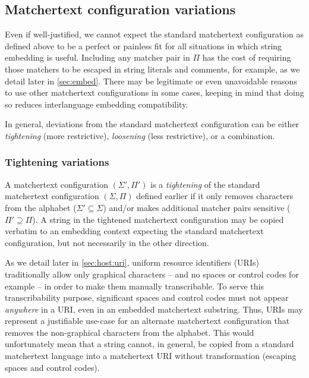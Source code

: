 \subsection{Matchertext configuration variations}
\label{sec:design:concrete:variations}

Even if well-justified,
we cannot expect the standard matchertext configuration
as defined above to be a perfect or painless fit
for all situations in which string embedding is useful.
Including any matcher pair in $\Pi$ has the cost
of requiring those matchers to be escaped
in string literals and comments, for example,
as we detail later in \cref{sec:embed}.
There may be legitimate or even unavoidable reasons
to use other matchertext configurations in some cases,
keeping in mind that doing so reduces interlanguage embedding compatibility.

In general, deviations from the standard matchertext configuration
can be either \emph{tightening} (more restrictive),
\emph{loosening} (less restrictive), or a combination.

\subsubsection{Tightening variations}
\label{sec:design:concrete:variations:tight}

A matchertext configuration $(\Sigma',\Pi')$
is a \emph{tightening} of
the standard matchertext configuration $(\Sigma,\Pi)$ defined earlier
if it only removes characters from the alphabet ($\Sigma' \subseteq \Sigma$)
and/or makes additional matcher pairs sensitive ($\Pi' \supseteq \Pi$).
A string in the tightened matchertext configuration
may be copied verbatim to an embedding context
expecting the standard matchertext configuration,
but not necessarily in the other direction.

As we detail later in \cref{sec:host:uri},
uniform resource identifiers (URIs)~\cite{rfc3986} traditionally allow
only graphical characters -- and no spaces or control codes for example --
in order to make them manually transcribable.
To serve this transcribability purpose,
significant spaces and control codes must not appear \emph{anywhere} in a URI,
even in an embedded matchertext substring.
Thus, URIs may represent a justifiable use-case
for an alternate matchertext configuration that removes
the non-graphical characters from the alphabet.
This would unfortunately mean that a string cannot, in general,
be copied from a standard matchertext language into a matchertext URI
without transformation (\ie escaping spaces and control codes).

